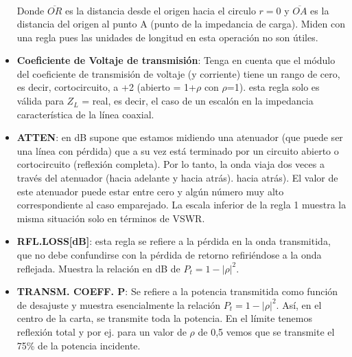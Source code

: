 \documentclass[
	12pt, %
	fleqn, %
	a4paper, %
	oneside, %
]{LegrandOrangeBook}
\begin{document}
\begin{itemize}
\begin{align*}
\end{align*}
Donde $\overline{OR}$ es la distancia desde el origen hacia el circulo $r=0$ y $\overline{OA}$ es la distancia del origen al punto A (punto de la impedancia de carga). Miden con una regla pues las unidades de longitud en esta operación no son útiles.
\item \textbf{Coeficiente de Voltaje de transmisión}: Tenga en cuenta que el módulo del coeficiente de transmisión de voltaje (y corriente) tiene un rango de cero, es decir, cortocircuito, a +2 (abierto = 1+$\rho$ con $\rho$=1). esta regla solo es válida para $Z_L$ = real, es decir, el caso de un escalón en la impedancia característica de la línea coaxial.
\item \textbf{ATTEN}: en dB supone que estamos midiendo una atenuador (que puede ser una línea con pérdida) que a su vez está terminado por un circuito abierto o cortocircuito (reflexión completa). Por lo tanto, la onda viaja dos veces a través del atenuador (hacia adelante y hacia atrás). hacia atrás). El valor de este atenuador puede estar entre cero y algún número muy alto correspondiente al caso emparejado. La escala inferior de la regla 1 muestra la misma situación solo en términos de VSWR.
\item \textbf{RFL.LOSS[dB]}: esta regla se refiere a la pérdida en la onda transmitida, que no debe confundirse con la pérdida de retorno refiriéndose a la onda reflejada. Muestra la relación en dB de $P_t=1-|\rho|^2$.
\item \textbf{TRANSM. COEFF. P}: Se refiere a la potencia transmitida como función de desajuste y muestra esencialmente la relación $P_t=1-|\rho|^2$. Así, en el centro de la carta, se transmite toda la potencia. En el límite tenemos reflexión total y
por ej. para un valor de $\rho$ de 0,5 vemos que se transmite el 75\% de la potencia incidente.
\end{itemize}
\newpage
\end{document}

